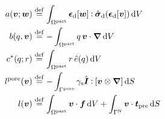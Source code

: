 \documentclass[MikaelDissertation.tex]{subfiles}
\begin{document}
\begin{align}
    a(\ta{v};\ta{w}) &\defeq
    \int_{\Omega^\particle}  \devop[\ta{w}]\dprod \hat{\ts{\sigma}}_\dev(\devop[\ta{v}]) \dif V
\label{eq3a} \\
    b(q,\ta{v}) &\defeq
    - \int_{\Omega^\particle}  q\,\ta{v}\cdot\diff \dif V
\label{eq3b} \\
    c^*(q;r) &\defeq
    \int_{\Omega^\particle}  r\,\hat{e}(q) \dif V
\label{eq3c} \\
    l^\pore(\ta{v}) &\defeq -\int_{\Gamma^\pore} \gamma_\surf \hat{\ta I} \dprod [\ta{v}\outerp\diff] \dif S 
\label{eq3d} \\
    l(\ta{v}) &\defeq \int_{\Omega^\particle} \ta{v}\cdot\ta{f} \dif V + \int_{\Gamma^\Neumann} \ta{v}\cdot \ta t_\prescribed \dif S
\label{eq3e}
\end{align}

%   
%     
% 
\end{document}
